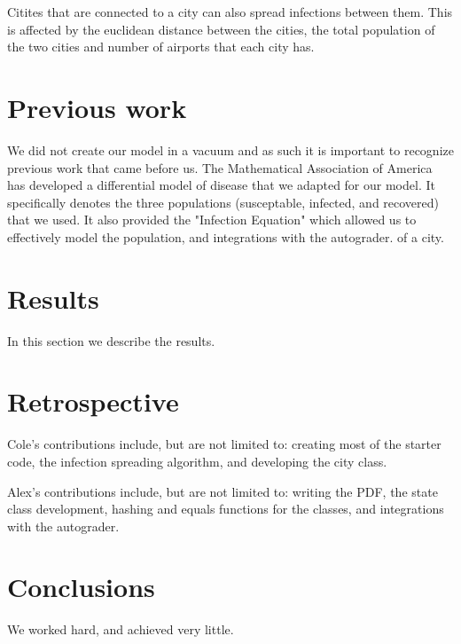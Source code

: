 \documentclass[12pt]{article}
\begin{document}
Citites that are connected to a city can also spread infections between them.
This is affected by the euclidean distance between the cities, the total population
of the two cities and number of airports that each city has.

\section*{Previous work}
We did not create our model in a vacuum and as such it is important to recognize
previous work that came before us. The Mathematical Association of America has
developed a differential model of disease that we adapted for our model. It specifically
denotes the three populations (susceptable, infected, and recovered) that we used. It
also provided the "Infection Equation" which allowed us to effectively model the population, and integrations with the
autograder. of a city.

\section*{Results}
In this section we describe the results.

\section*{Retrospective}
Cole's contributions include, but are not limited to: creating most of the starter code,
the infection spreading algorithm, and developing the city class.

Alex's contributions include, but are not limited to: writing the PDF, the state class
development, hashing and equals functions for the classes, and integrations with the
autograder.

\section*{Conclusions}
We worked hard, and achieved very little.
\end{document}
